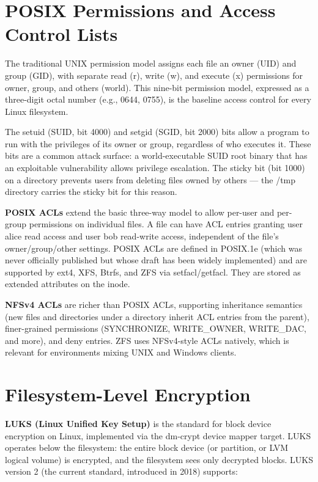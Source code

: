 \section{POSIX Permissions and Access Control Lists}
The traditional UNIX permission model assigns each file an owner (UID) and group (GID), with separate read (r), write (w), and execute (x) permissions for owner, group, and others (world). This nine-bit permission model, expressed as a three-digit octal number (e.g., 0644, 0755), is the baseline access control for every Linux filesystem.

The setuid (SUID, bit 4000) and setgid (SGID, bit 2000) bits allow a program to run with the privileges of its owner or group, regardless of who executes it. These bits are a common attack surface: a world-executable SUID root binary that has an exploitable vulnerability allows privilege escalation. The sticky bit (bit 1000) on a directory prevents users from deleting files owned by others --- the /tmp directory carries the sticky bit for this reason.

\textbf{POSIX ACLs} extend the basic three-way model to allow per-user and per-group permissions on individual files. A file can have ACL entries granting user alice read access and user bob read-write access, independent of the file's owner/group/other settings. POSIX ACLs are defined in POSIX.1e (which was never officially published but whose draft has been widely implemented) and are supported by ext4, XFS, Btrfs, and ZFS via setfacl/getfacl. They are stored as extended attributes on the inode.

\textbf{NFSv4 ACLs} are richer than POSIX ACLs, supporting inheritance semantics (new files and directories under a directory inherit ACL entries from the parent), finer-grained permissions (SYNCHRONIZE, WRITE\_OWNER, WRITE\_DAC, and more), and deny entries. ZFS uses NFSv4-style ACLs natively, which is relevant for environments mixing UNIX and Windows clients.

\section{Filesystem-Level Encryption}
\textbf{LUKS (Linux Unified Key Setup)} is the standard for block device encryption on Linux, implemented via the dm-crypt device mapper target. LUKS operates below the filesystem: the entire block device (or partition, or LVM logical volume) is encrypted, and the filesystem sees only decrypted blocks. LUKS version 2 (the current standard, introduced in 2018) supports:

